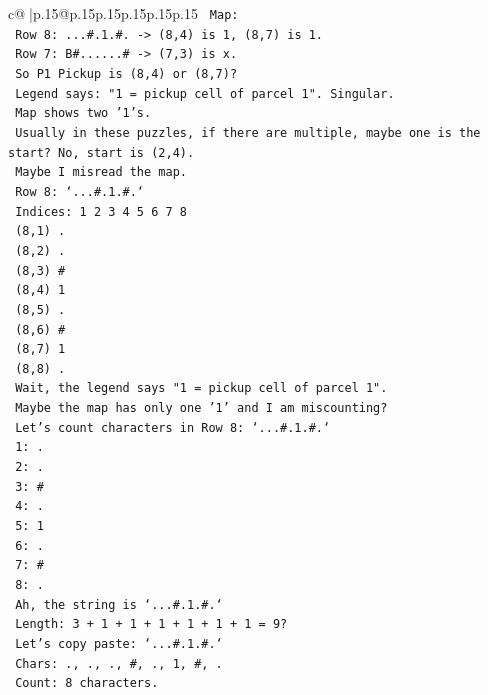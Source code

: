 \documentclass{article}
\begin{document}
{\begin{supertabular}{c@{$\;$}|p{.15\linewidth}@{}p{.15\linewidth}p{.15\linewidth}p{.15\linewidth}p{.15\linewidth}p{.15\linewidth}}
{{{\texttt{   Map:} \\
\texttt{   Row 8: ...\#.1.\#. {-}> (8,4) is 1, (8,7) is 1.} \\
\texttt{   Row 7: B\#......\# {-}> (7,3) is x.} \\
\texttt{   So P1 Pickup is (8,4) or (8,7)?} \\
\texttt{   Legend says: "1 = pickup cell of parcel 1". Singular.} \\
\texttt{   Map shows two '1's.} \\
\texttt{   Usually in these puzzles, if there are multiple, maybe one is the start? No, start is (2,4).} \\
\texttt{   Maybe I misread the map.} \\
\texttt{   Row 8: `...\#.1.\#.`} \\
\texttt{   Indices: 1 2 3 4 5 6 7 8} \\
\texttt{   (8,1) .} \\
\texttt{   (8,2) .} \\
\texttt{   (8,3) \#} \\
\texttt{   (8,4) 1} \\
\texttt{   (8,5) .} \\
\texttt{   (8,6) \#} \\
\texttt{   (8,7) 1} \\
\texttt{   (8,8) .} \\
\texttt{   Wait, the legend says "1 = pickup cell of parcel 1".} \\
\texttt{   Maybe the map has only one '1' and I am miscounting?} \\
\texttt{   Let's count characters in Row 8: `...\#.1.\#.`} \\
\texttt{   1: .} \\
\texttt{   2: .} \\
\texttt{   3: \#} \\
\texttt{   4: .} \\
\texttt{   5: 1} \\
\texttt{   6: .} \\
\texttt{   7: \#} \\
\texttt{   8: .} \\
\texttt{   Ah, the string is `...\#.1.\#.`} \\
\texttt{   Length: 3 + 1 + 1 + 1 + 1 + 1 + 1 = 9?} \\
\texttt{   Let's copy paste: `...\#.1.\#.`} \\
\texttt{   Chars: ., ., ., \#, ., 1, \#, .} \\
\texttt{   Count: 8 characters.} \\
}}}
\end{supertabular}}
\end{document}
